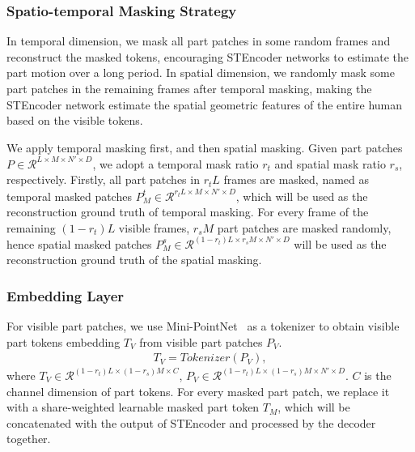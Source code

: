 \subsubsection{Spatio-temporal Masking Strategy}
In temporal dimension, we mask all part patches in some random frames and reconstruct the masked tokens, encouraging STEncoder networks to estimate the part motion over a long period.
In spatial dimension, we randomly mask some part patches in the remaining frames after temporal masking, making the STEncoder network estimate the spatial geometric features of the entire human based on the visible tokens.

We apply temporal masking first, and then spatial masking. Given part patches $P \in \mathcal{R}^{L \times M \times N' \times D}$, we adopt a temporal mask ratio $r_t$ and spatial mask ratio $r_s$, respectively. Firstly, all part patches in $r_tL$ frames are masked, named as temporal masked patches $P_M^t \in \mathcal{R}^{r_tL \times M \times N' \times D}$, which will be used as the reconstruction ground truth of temporal masking. For every frame of the remaining $(1-r_t)L$ visible frames, $r_sM$ part patches are masked randomly, hence spatial masked patches $P_M^s \in \mathcal{R}^{(1-r_t)L \times r_sM \times N' \times D}$ will be used as the reconstruction ground truth of the spatial masking.

\subsubsection{Embedding Layer}
\label{subsubsec:embedding}
For visible part patches, we use Mini-PointNet~\cite{qi2017pointnet} as a tokenizer to obtain visible part tokens embedding $T_V$ from visible part patches $P_V$. 
\begin{equation}
    \begin{aligned}
    T_V = Tokenizer(P_V),
    \end{aligned}
\end{equation}
where $T_V \in \mathcal{R}^{(1-r_t)L \times (1-r_s)M \times C}$, $P_V \in \mathcal{R}^{(1-r_t)L \times (1-r_s)M \times N' \times D}$. $C$ is the channel dimension of part tokens. 
For every masked part patch, we replace it with a share-weighted learnable masked part token $T_M$, which will be concatenated with the output of STEncoder and processed by the decoder together.

